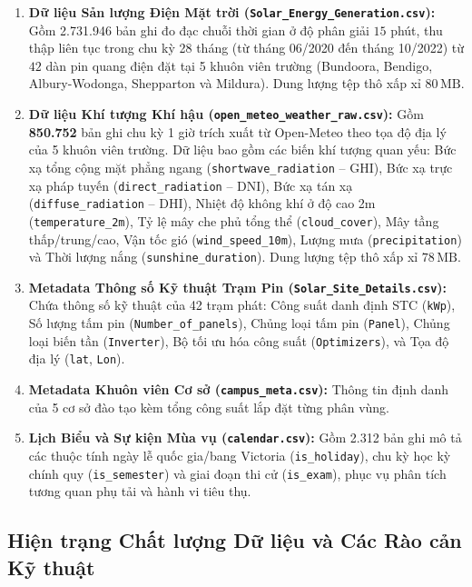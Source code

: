 \documentclass[12pt, a4paper]{report}
\begin{document}
\begin{enumerate}[label=\arabic*., leftmargin=*]
    \item \textbf{Dữ liệu Sản lượng Điện Mặt trời (\texttt{Solar\_Energy\_Generation.csv}):} Gồm 2.731.946 bản ghi đo đạc chuỗi thời gian ở độ phân giải $15$ phút, thu thập liên tục trong chu kỳ 28 tháng (từ tháng 06/2020 đến tháng 10/2022) từ $42$ dàn pin quang điện đặt tại 5 khuôn viên trường (Bundoora, Bendigo, Albury-Wodonga, Shepparton và Mildura). Dung lượng tệp thô xấp xỉ $80\,\text{MB}$.
    
    \item \textbf{Dữ liệu Khí tượng Khí hậu (\texttt{open\_meteo\_weather\_raw.csv}):} Gồm \textbf{850.752} bản ghi chu kỳ 1 giờ trích xuất từ Open-Meteo theo tọa độ địa lý của 5 khuôn viên trường. Dữ liệu bao gồm các biến khí tượng quan yếu: Bức xạ tổng cộng mặt phẳng ngang (\texttt{shortwave\_radiation} -- GHI), Bức xạ trực xạ pháp tuyến (\texttt{direct\_radiation} -- DNI), Bức xạ tán xạ (\texttt{diffuse\_radiation} -- DHI), Nhiệt độ không khí ở độ cao 2m (\texttt{temperature\_2m}), Tỷ lệ mây che phủ tổng thể (\texttt{cloud\_cover}), Mây tầng thấp/trung/cao, Vận tốc gió (\texttt{wind\_speed\_10m}), Lượng mưa (\texttt{precipitation}) và Thời lượng nắng (\texttt{sunshine\_duration}). Dung lượng tệp thô xấp xỉ $78\,\text{MB}$.
    
    \item \textbf{Metadata Thông số Kỹ thuật Trạm Pin (\texttt{Solar\_Site\_Details.csv}):} Chứa thông số kỹ thuật của 42 trạm phát: Công suất danh định STC (\texttt{kWp}), Số lượng tấm pin (\texttt{Number\_of\_panels}), Chủng loại tấm pin (\texttt{Panel}), Chủng loại biến tần (\texttt{Inverter}), Bộ tối ưu hóa công suất (\texttt{Optimizers}), và Tọa độ địa lý (\texttt{lat}, \texttt{Lon}).
    
    \item \textbf{Metadata Khuôn viên Cơ sở (\texttt{campus\_meta.csv}):} Thông tin định danh của 5 cơ sở đào tạo kèm tổng công suất lắp đặt từng phân vùng.
    
    \item \textbf{Lịch Biểu và Sự kiện Mùa vụ (\texttt{calendar.csv}):} Gồm 2.312 bản ghi mô tả các thuộc tính ngày lễ quốc gia/bang Victoria (\texttt{is\_holiday}), chu kỳ học kỳ chính quy (\texttt{is\_semester}) và giai đoạn thi cử (\texttt{is\_exam}), phục vụ phân tích tương quan phụ tải và hành vi tiêu thụ.
\end{enumerate}

\subsection{Hiện trạng Chất lượng Dữ liệu và Các Rào cản Kỹ thuật}
\end{document}

